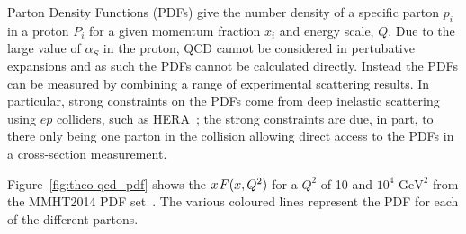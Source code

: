 Parton Density Functions (PDFs) give the number density of a specific parton $p_i$ in a proton $P_i$
for a given momentum fraction $x_i$ and energy scale, $Q$.
Due to the large value of $\alpha_S$ in the proton, QCD cannot be considered in pertubative expansions and as such the PDFs cannot be calculated directly.
Instead the PDFs can be measured by combining a range of experimental scattering results.
In particular, strong constraints on the PDFs come from deep inelastic scattering using $ep$ colliders, such as HERA~\cite{theo-qcd_hera};
the strong constraints are due, in part, to there only being one parton in the collision allowing direct access to the PDFs in a cross-section measurement.


Figure~\ref{fig:theo-qcd_pdf} shows the $x\hspace{0.3mm}F(x,Q^2)$ for a $Q^2$ of 10 and $10^4$ $\text{GeV}^2$
from the MMHT2014 PDF set~\cite{theo-qcd_pdf}.
The various coloured lines represent the PDF for each of the different partons.

